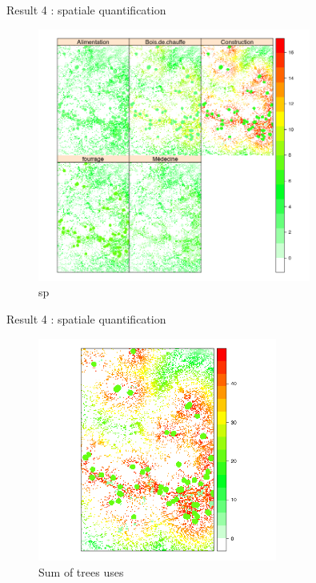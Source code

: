 \documentclass[newPxFont]{beamer}
\begin{document}
\begin{frame}[c]{Result 4 : spatiale quantification}
\vspace{-1cm}
\begin{figure}
  \centering
  \includegraphics[width = 0.8\textwidth]{img/usages_sp_distances}
  \caption{sp}
\end{figure}

\end{frame}\begin{frame}[c]{Result 4 : spatiale quantification}
\vspace{-1cm}
\begin{figure}
  \centering
  \includegraphics[width = 0.7\textwidth]{img/sum_use_sp}
  \caption{Sum of trees uses}
\end{figure}

\end{frame}
\end{document}
